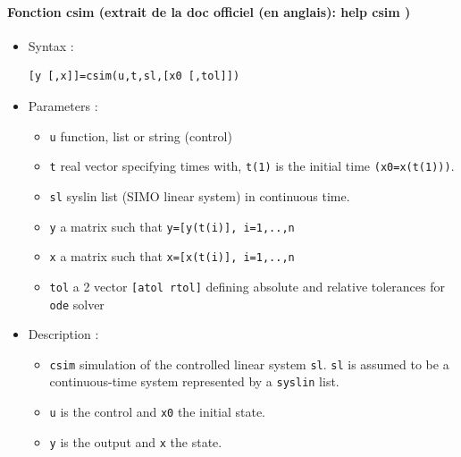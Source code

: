 \begin{doc}
\paragraph{Fonction csim (extrait de la doc officiel (en anglais): help csim )}
\begin{itemize}
    \item Syntax :
    \begin{code}
\begin{verbatim}
[y [,x]]=csim(u,t,sl,[x0 [,tol]])
\end{verbatim}
    \end{code}
    \item Parameters :
    \begin{itemize}
        \item \verb?u?  function, list or string (control)
        \item \verb?t?  real vector specifying times with, \verb?t(1)? is the 
              initial time \verb?(x0=x(t(1)))?.
        \item \verb?sl? syslin list (SIMO linear system) in continuous time.
        \item \verb?y?  a matrix such that \verb?y=[y(t(i)], i=1,..,n?
        \item \verb?x?  a matrix such that \verb?x=[x(t(i)], i=1,..,n?
        \item \verb?tol? a 2 vector \verb?[atol rtol]? defining absolute and 
              relative tolerances for \verb?ode? solver
    \end{itemize}

    \item Description :

    \begin{itemize} 
        \item \verb?csim? simulation of the controlled linear system \verb?sl?.
              \verb?sl? is assumed to be a continuous-time system represented 
              by a \verb?syslin? list.
        \item \verb?u?  is the control and \verb?x0? the initial state.
        \item \verb?y?  is the output and \verb?x? the state.
    \end{itemize}


\end{itemize}
\end{doc}

